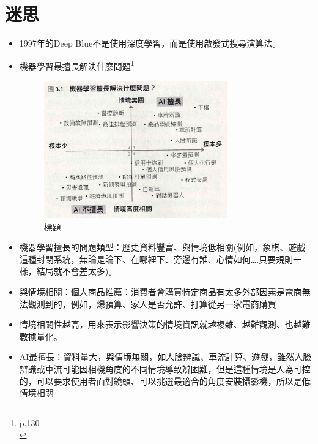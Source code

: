 \documentclass[a4paper,12pt]{article}
\begin{document}
\section{迷思}
\label{sec:orge6a5770}
\begin{itemize}
\item 1997年的Deep Blue不是使用深度學習，而是使用啟發式搜尋演算法。\\
\item 機器學習最擅長解決什麼問題\footnote{p.130\\}\\
\begin{figure}[htbp]
\centering
\includegraphics[width=300]{images/迷思/2023-01-24_23-11-05_Scan 3.jpeg}
\caption{\label{fig:Name}標題}
\end{figure}
\item 機器學習擅長的問題類型：歷史資料豐富、與情境低相關(例如，象棋、遊戲這種封閉系統，無論是論下、在哪裡下、旁邊有誰、心情如何\ldots{}.只要規則一樣，結局就不會差太多)。\\
\item 與情境相關：個人商品推薦：消費者會購買特定商品有太多外部因素是電商無法觀測到的，例如，爆預算、家人是否允許、打算從另一家電商購買\\
\item 情境相關性越高，用來表示影響決策的情境資訊就越複雜、越難觀測、也越難數據量化。\\
\item AI最擅長：資料量大，與情境無關，如人臉辨識、車流計算、遊戲，雖然人臉辨識或車流可能因相機角度的不同情境導致辨困難，但是這種情境是人為可控的，可以要求使用者面對鏡頭、可以挑選最適合的角度安裝攝影機，所以是低情境相關\\

\end{itemize}
\end{document}
